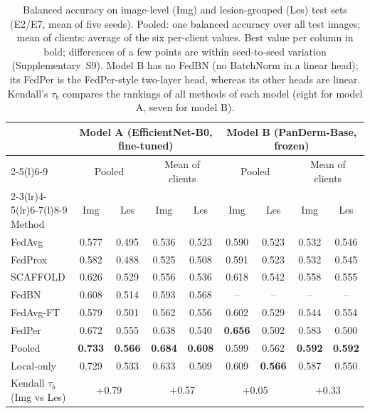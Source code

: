 \begin{table}[!t]
\centering
\caption{Balanced accuracy on image-level (Img) and lesion-grouped (Les) test sets (E2/E7, mean of five
seeds). Pooled: one balanced accuracy over all test images; mean of clients: average of the six per-client
values. Best value per column in bold; differences of a few points are within seed-to-seed variation
(Supplementary~S9). Model B has no FedBN (no BatchNorm in a linear head); its FedPer is the FedPer-style
two-layer head, whereas its other heads are linear. Kendall's $\tau_b$ compares the rankings of all
methods of each model (eight for model A, seven for model B).}
\label{tab:ba}
\setlength{\tabcolsep}{4.5pt}
\begin{tabular}{@{}lcccccccc@{}}
\toprule
 & \multicolumn{4}{c}{Model A (EfficientNet-B0, fine-tuned)} & \multicolumn{4}{c}{Model B (PanDerm-Base, frozen)} \\
\cmidrule(lr){2-5}\cmidrule(l){6-9}
 & \multicolumn{2}{c}{Pooled} & \multicolumn{2}{c}{Mean of clients} & \multicolumn{2}{c}{Pooled} & \multicolumn{2}{c}{Mean of clients} \\
\cmidrule(lr){2-3}\cmidrule(lr){4-5}\cmidrule(lr){6-7}\cmidrule(l){8-9}
Method & Img & Les & Img & Les & Img & Les & Img & Les \\
\midrule
FedAvg & 0.577 & 0.495 & 0.536 & 0.523 & 0.590 & 0.523 & 0.532 & 0.546 \\
FedProx & 0.582 & 0.488 & 0.525 & 0.508 & 0.591 & 0.523 & 0.532 & 0.545 \\
SCAFFOLD & 0.626 & 0.529 & 0.556 & 0.536 & 0.618 & 0.542 & 0.558 & 0.555 \\
FedBN & 0.608 & 0.514 & 0.593 & 0.568 & -- & -- & -- & -- \\
FedAvg-FT & 0.579 & 0.501 & 0.562 & 0.556 & 0.602 & 0.529 & 0.544 & 0.554 \\
FedPer & 0.672 & 0.555 & 0.638 & 0.540 & \textbf{0.656} & 0.502 & 0.583 & 0.500 \\
\midrule
Pooled & \textbf{0.733} & \textbf{0.566} & \textbf{0.684} & \textbf{0.608} & 0.599 & 0.562 & \textbf{0.592} & \textbf{0.592} \\
Local-only & 0.729 & 0.533 & 0.633 & 0.509 & 0.609 & \textbf{0.566} & 0.587 & 0.550 \\
\midrule
Kendall $\tau_b$ (Img vs Les) & \multicolumn{2}{c}{+0.79} & \multicolumn{2}{c}{+0.57} & \multicolumn{2}{c}{+0.05} & \multicolumn{2}{c}{+0.33} \\
\bottomrule
\end{tabular}
\end{table}
